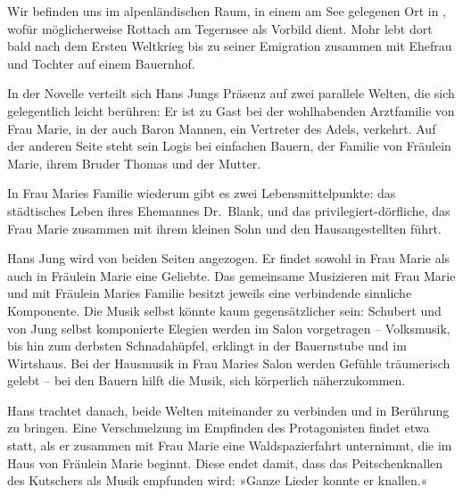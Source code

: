 \begin{small}
\bigskip

\noindent{}Wir befinden uns im alpenländischen Raum, in einem am See gelegenen Ort
in \textit{\buchtitel{}}, wofür möglicherweise Rottach am Tegernsee
als Vorbild dient. Mohr lebt dort bald nach dem Ersten Weltkrieg
bis zu seiner Emigration zusammen mit Ehefrau und Tochter auf einem Bauernhof.

In der Novelle verteilt sich Hans Jungs Präsenz auf zwei parallele
Welten, die sich gelegentlich leicht berühren: Er ist
zu Gast bei der wohlhabenden Arztfamilie von Frau Marie,
in der auch Baron Mannen, ein Vertreter des Adels, verkehrt.
Auf der anderen Seite steht sein Logis bei einfachen
Bauern, der Familie von Fräulein Marie, ihrem Bruder Thomas und der
Mutter.

In Frau Maries Familie wiederum gibt es zwei Lebensmittelpunkte:
das städtisches Leben
ihres Ehemannes Dr.\ Blank, und das privilegiert-dörfliche, das Frau Marie
zusammen mit ihrem kleinen Sohn und den Hausangestellten führt.

Hans Jung wird von beiden Seiten angezogen. Er findet sowohl
in Frau Marie als auch in Fräulein Marie eine Geliebte.
Das gemeinsame Musizieren mit Frau Marie und mit Fräulein
Maries Familie besitzt jeweils eine verbindende sinnliche Komponente.
Die Musik selbst könnte kaum gegensätzlicher sein: Schubert und von Jung
selbst komponierte Elegien werden im Salon vorgetragen –
Volksmusik, bis hin zum derbsten Schnadahüpfel, erklingt in der Bauernstube
und im Wirtshaus. Bei der Hausmusik in Frau Maries Salon werden Gefühle
träumerisch gelebt – bei den Bauern hilft die Musik, sich körperlich
näherzukommen.

Hans trachtet danach, beide Welten miteinander zu verbinden
und in Berührung zu bringen. Eine Verschmelzung im Empfinden
des Protagonisten findet etwa statt, als er zusammen
mit Frau Marie eine Waldspazierfahrt unternimmt,%
die im Haus von Fräulein Marie beginnt. Diese endet damit,
dass das Peitschenknallen des Kutschers als Musik
empfunden wird: »Ganze Lieder konnte er knallen.«


\end{small}
